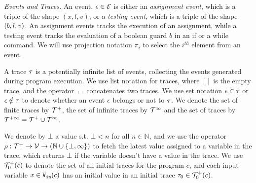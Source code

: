 \noindent\emph{Events and Traces.} 
An event, $\mathtt{\epsilon} \in \mathcal{E}$ is either an \emph{assignment event}, which is  a triple of the shape $({x}, l,v)$, or a \emph{testing event}, which is a triple of the shape $(b, l, v)$. An assignment events tracks the execution of an assignment, while a testing event tracks the evaluation
of a boolean guard $b$ in an if or a while command.
We will use projection notation $\pi_i$ to select the $i^{th}$ element
from an event.


A trace $\mathtt{\tau}$ is a potentially infinite list of events, 
collecting the events generated  during program execution. 
We use list notation for traces, where $[]$ is the empty trace, and
the operator ${\scriptscriptstyle ++}$ concatenates two traces. We use set notation $\mathtt{\epsilon} \in \mathtt{\tau}$ or $\mathtt{\epsilon} \notin \mathtt{\tau}$ to denote whether an event $\mathtt{\epsilon}$ belongs or not to $\mathtt{\tau}$.
{
We denote the set of finite traces by $\mathcal{T}^{+}$, the set of infinite traces by $\mathcal{T}^{\infty}$ and the set of traces by $\mathcal{T}^{+\infty} = \mathcal{T}^{+} \cup \mathcal{T}^{\infty}$.
}

%
We denote by $\bot$ a value s.t. $\bot < n $ for all $n \in \mathbb{N}$, and we use the operator $\rho: {\mathcal{T}^{+}} \to \mathcal{V} \to(\mathbb{N} \cup \{\bot, \infty\})$  to fetch the latest value assigned to a variable in the trace, which returns $\bot$ if the variable doesn't have a value in the trace.
We use $\mathcal{T}^{+}_0(c)$ to denote the set of all initial traces for the program $c$, and each input variable $x \in {\ensuremath{\mathtt{V_{\mathtt{in}}}}}(c)$ has an initial value in an initial trace $\mathtt{\tau}_0 \in \mathcal{T}^{+}_0(c)$.\\


